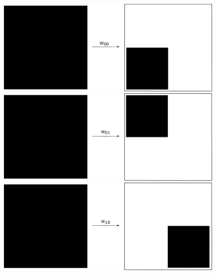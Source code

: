 \documentclass{beamer}
\begin{document}
\begin{frame}
    \begin{figure}
        \centering
        \includegraphics[scale=0.2]{w_00.pdf}
        \includegraphics[scale=0.2]{w_01.pdf}
        \includegraphics[scale=0.2]{w_10.pdf}
    \end{figure}

\end{frame}
\end{document}
